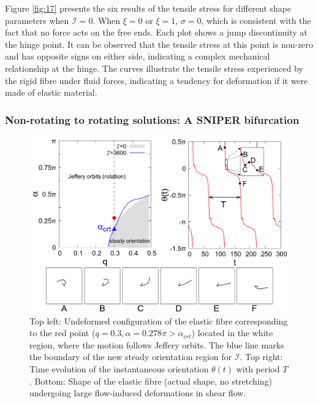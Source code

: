 \documentclass[lineno]{JFM-FLM_Au}
\begin{document}
Figure \ref{fig:17} presents the six results of the tensile stress for different shape parameters when $\mathcal{I}=0$. When $\xi=0$ or $\xi=1$, $\sigma=0$, which is consistent with the fact that no force acts on the free ends. Each plot shows a jump discontinuity at the hinge point. It can be observed that the tensile stress at this point is non-zero and has opposite signs on either side, indicating a complex mechanical relationship at the hinge. The curves illustrate the tensile stress experienced by the rigid fibre under fluid forces, indicating a tendency for deformation if it were made of elastic material. 

\subsubsection{Non-rotating to rotating solutions: A SNIPER bifurcation}
\begin{figure}[!h]
	\begin{center}
		\includegraphics[width=1\textwidth]{plot/rotating_and_non_rotating/rotating.png}
		\caption{Top left: Undeformed configuration of the elastic fibre corresponding to the red point ($q=0.3, \alpha=0.278\pi>\alpha_{crt}$) located in the white region, where the motion follows Jeffery orbits. The blue line marks the boundary of the new steady orientation region for $\mathcal{I}$. Top right: Time evolution of the instantaneous orientation $\theta(t)$ with period $T$. Bottom: Shape of the elastic fibre (actual shape, no stretching) undergoing large flow-induced deformations in shear flow.}
		\label{fig:24}
	\end{center}
\end{figure}
\end{document}
